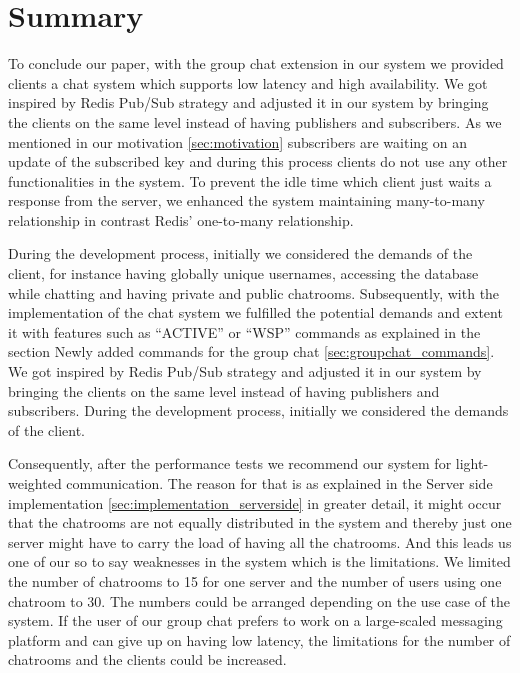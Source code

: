 \section{Summary}
\label{sec:summary}

To conclude our paper, with the group chat extension in our system we provided clients a chat system which supports low latency and high availability. We got inspired by Redis Pub/Sub strategy and adjusted it in our system by bringing the clients on the same level instead of having publishers and subscribers. As we mentioned in our motivation \ref{sec:motivation} subscribers are waiting on an update of the subscribed key and during this process clients do not use any other functionalities in the system. To prevent the idle time which client just waits a response from the server, we enhanced the system maintaining many-to-many relationship in contrast Redis’ one-to-many relationship.

During the development process, initially we considered the demands of the client, for instance having globally unique usernames, accessing the database while chatting and having private and public chatrooms. Subsequently, with the implementation of the chat system we fulfilled the potential demands and extent it with features such as “ACTIVE” or “WSP” commands as explained in the section Newly added commands for the group chat \ref{sec:groupchat_commands}.
We got inspired by Redis Pub/Sub strategy and adjusted it in our system by bringing the clients on the same level instead of having publishers and subscribers.
During the development process, initially we considered the demands of the client.

Consequently, after the performance tests we recommend our system for light-weighted communication. The reason for that is as explained in the Server side implementation \ref{sec:implementation_serverside} in greater detail, it might occur that the chatrooms are not equally distributed in the system and thereby just one server might have to carry the load of having all the chatrooms. And this leads us one of our so to say weaknesses in the system which is the limitations. We limited the number of chatrooms to 15 for one server and the number of users using one chatroom to 30. The numbers could be arranged depending on the use case of the system. If the user of our group chat prefers to work on a large-scaled messaging platform and can give up on having low latency, the limitations for the number of chatrooms and the clients could be increased.

